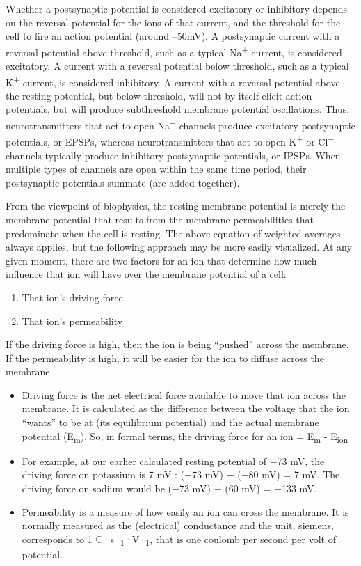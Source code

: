 Whether a postsynaptic potential is considered excitatory or inhibitory depends on the reversal potential for the ions of that current, and the threshold for the cell to fire an action potential (around --50mV). A postsynaptic current with a reversal potential above threshold, such as a typical Na\textsuperscript{+} current, is considered excitatory. A current with a reversal potential below threshold, such as a typical K\textsuperscript{+} current, is considered inhibitory. A current with a reversal potential above the resting potential, but below threshold, will not by itself elicit action potentials, but will produce subthreshold membrane potential oscillations. Thus, neurotransmitters that act to open Na\textsuperscript{+} channels produce excitatory postsynaptic potentials, or EPSPs, whereas neurotransmitters that act to open K\textsuperscript{+} or Cl\textsuperscript{−} channels typically produce inhibitory postsynaptic potentials, or IPSPs. When multiple types of channels are open within the same time period, their postsynaptic potentials summate (are added together).

From the viewpoint of biophysics, the resting membrane potential is merely the membrane potential that results from the membrane permeabilities that predominate when the cell is resting. The above equation of weighted averages always applies, but the following approach may be more easily visualized. At any given moment, there are two factors for an ion that determine how much influence that ion will have over the membrane potential of a cell:

\begin{enumerate}
\def\labelenumi{\arabic{enumi}.}
\tightlist
\item
  That ion's driving force
\item
  That ion's permeability
\end{enumerate}

If the driving force is high, then the ion is being ``pushed'' across the membrane. If the permeability is high, it will be easier for the ion to diffuse across the membrane.

\begin{itemize}
\tightlist
\item
  Driving force is the net electrical force available to move that ion across the membrane. It is calculated as the difference between the voltage that the ion ``wants'' to be at (its equilibrium potential) and the actual membrane potential (E\textsubscript{m}). So, in formal terms, the driving force for an ion = E\textsubscript{m} - E\textsubscript{ion}
\item
  For example, at our earlier calculated resting potential of −73 mV, the driving force on potassium is 7 mV : (−73 mV) − (−80 mV) = 7 mV. The driving force on sodium would be (−73 mV) − (60 mV) = −133 mV.
\item
  Permeability is a measure of how easily an ion can cross the membrane. It is normally measured as the (electrical) conductance and the unit, siemens, corresponds to 1 C·s\textsubscript{−1}·V\textsubscript{−1}, that is one coulomb per second per volt of potential.
\end{itemize}

